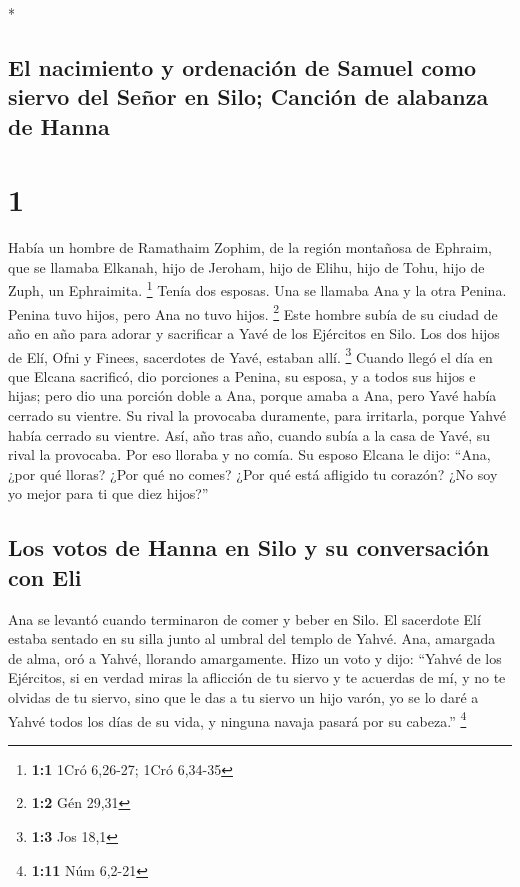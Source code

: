 \begin{paracol}{2} \switchcolumn[0]*

\hypertarget{el-nacimiento-y-ordenaciuxf3n-de-samuel-como-siervo-del-seuxf1or-en-silo-canciuxf3n-de-alabanza-de-hanna}{%
\subsection{El nacimiento y ordenación de Samuel como siervo del Señor
en Silo; Canción de alabanza de
Hanna}\label{el-nacimiento-y-ordenaciuxf3n-de-samuel-como-siervo-del-seuxf1or-en-silo-canciuxf3n-de-alabanza-de-hanna}}

\hypertarget{section}{%
\section{1}\label{section}}

 Había un hombre de Ramathaim Zophim, de la región
montañosa de Ephraim, que se llamaba Elkanah, hijo de Jeroham, hijo de
Elihu, hijo de Tohu, hijo de Zuph, un Ephraimita. \footnote{\textbf{1:1}
  1Cró 6,26-27; 1Cró 6,34-35}  Tenía dos esposas. Una se
llamaba Ana y la otra Penina. Penina tuvo hijos, pero Ana no tuvo hijos.
\footnote{\textbf{1:2} Gén 29,31}  Este hombre subía de su
ciudad de año en año para adorar y sacrificar a Yavé de los Ejércitos en
Silo. Los dos hijos de Elí, Ofni y Finees, sacerdotes de Yavé, estaban
allí. \footnote{\textbf{1:3} Jos 18,1}  Cuando llegó el
día en que Elcana sacrificó, dio porciones a Penina, su esposa, y a
todos sus hijos e hijas;  pero dio una porción doble a
Ana, porque amaba a Ana, pero Yavé había cerrado su vientre.
 Su rival la provocaba duramente, para irritarla, porque
Yahvé había cerrado su vientre.  Así, año tras año, cuando
subía a la casa de Yavé, su rival la provocaba. Por eso lloraba y no
comía.  Su esposo Elcana le dijo: ``Ana, ¿por qué lloras?
¿Por qué no comes? ¿Por qué está afligido tu corazón? ¿No soy yo mejor
para ti que diez hijos?''

\hypertarget{los-votos-de-hanna-en-silo-y-su-conversaciuxf3n-con-eli}{%
\subsection{Los votos de Hanna en Silo y su conversación con
Eli}\label{los-votos-de-hanna-en-silo-y-su-conversaciuxf3n-con-eli}}

 Ana se levantó cuando terminaron de comer y beber en
Silo. El sacerdote Elí estaba sentado en su silla junto al umbral del
templo de Yahvé.  Ana, amargada de alma, oró a Yahvé,
llorando amargamente.  Hizo un voto y dijo: ``Yahvé de
los Ejércitos, si en verdad miras la aflicción de tu siervo y te
acuerdas de mí, y no te olvidas de tu siervo, sino que le das a tu
siervo un hijo varón, yo se lo daré a Yahvé todos los días de su vida, y
ninguna navaja pasará por su cabeza.'' \footnote{\textbf{1:11} Núm
  6,2-21}


\end{paracol}
